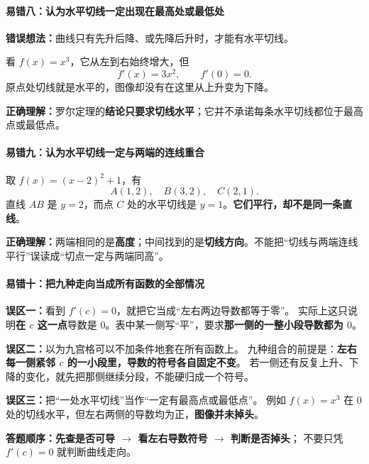 \clearpage
\begin{trapbox}
\paragraph{易错八：认为水平切线一定出现在最高处或最低处}

\textbf{错误想法：}曲线只有先升后降、或先降后升时，才能有水平切线。

看 $f(x)=x^3$，它从左到右始终增大，但
\[
 f'(x)=3x^2,\qquad f'(0)=0.
\]
原点处切线就是水平的，图像却没有在这里从上升变为下降。

\textbf{正确理解：}罗尔定理的\textbf{结论只要求切线水平}；它并不承诺每条水平切线都位于最高点或最低点。
\end{trapbox}
\clearpage
\begin{trapbox}
\paragraph{易错九：认为水平切线一定与两端的连线重合}

取 $f(x)=(x-2)^2+1$，有
\[
 A(1,2),\quad B(3,2),\quad C(2,1).
\]
直线 $AB$ 是 $y=2$，而点 $C$ 处的水平切线是 $y=1$。\textbf{它们平行，却不是同一条直线}。

\textbf{正确理解：}两端相同的是\textbf{高度}；中间找到的是\textbf{切线方向}。不能把“切线与两端连线平行”误读成“切点一定与两端同高”。
\end{trapbox}


\clearpage
\begin{trapbox}
\paragraph{易错十：把九种走向当成所有函数的全部情况}

\textbf{误区一：}看到 $f'(c)=0$，就把它当成``左右两边导数都等于零''。
实际上这只说明\textbf{在 $c$ 这一点}导数是 $0$。表中某一侧写``平''，要求\textbf{那一侧的一整小段导数都为 $0$}。

\textbf{误区二：}以为九宫格可以不加条件地套在所有函数上。
九种组合的前提是：\textbf{左右每一侧紧邻 $c$ 的一小段里，导数的符号各自固定不变}。
若一侧还有反复上升、下降的变化，就先把那侧继续分段，不能硬归成一个符号。

\textbf{误区三：}把``一处水平切线''当作``一定有最高点或最低点''。
例如 $f(x)=x^3$ 在 $0$ 处的切线水平，但左右两侧的导数均为正，\textbf{图像并未掉头}。

\textbf{答题顺序：}\textbf{先查是否可导 $\to$ 看左右导数符号 $\to$ 判断是否掉头}；
不要只凭 $f'(c)=0$ 就判断曲线走向。
\end{trapbox}
